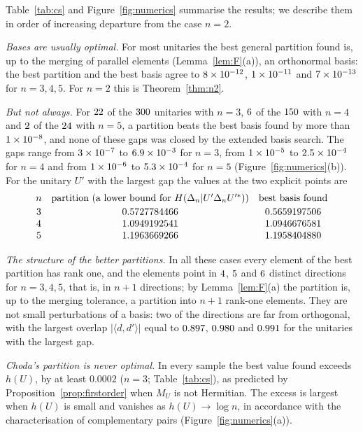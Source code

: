 \documentclass[11pt]{article}
\theoremstyle{plain}
\theoremstyle{definition}
\theoremstyle{remark}
\begin{document}
Table~\ref{tab:cs} and Figure~\ref{fig:numerics} summarise the results; we describe them in order of increasing departure
from the case $n=2$.

\emph{Bases are usually optimal.} For most unitaries the best general partition found is, up to the merging of parallel
elements (Lemma~\ref{lem:F}(a)), an orthonormal basis: the best partition and the best basis agree to $8\times10^{-12}$,
$1\times10^{-11}$ and $7\times10^{-13}$ for $n=3,4,5$. For $n=2$ this is Theorem~\ref{thm:n2}.

\emph{But not always.} For $22$ of the $300$ unitaries with $n=3$, $6$ of the $150$ with
$n=4$ and $2$ of the $24$ with $n=5$, a partition beats the best basis found by more than $1\times10^{-8}$, and none
of these gaps was closed by the extended basis search. The gaps range from $3\times10^{-7}$ to $6.9\times10^{-3}$ for $n=3$, from
$1\times10^{-5}$ to $2.5\times10^{-4}$ for $n=4$ and from $1\times10^{-6}$ to $5.3\times10^{-4}$ for $n=5$ (Figure~\ref{fig:numerics}(b)).
For the unitary $U'$ with the largest gap the values at the two explicit points are
\[
  \begin{array}{ccc}
  n & \text{partition (a lower bound for }H(\Delta_n|U'\Delta_nU'^*)) & \text{best basis found}\\[2pt]
  3 & 0.5727784466 & 0.5659197506\\
  4 & 1.0949192541 & 1.0946676581\\
  5 & 1.1963669266 & 1.1958404880
  \end{array}
\]

\emph{The structure of the better partitions.} In all these cases every element of the best partition has rank one, and the
elements point in $4$, $5$ and $6$ distinct directions for $n=3,4,5$, that is, in $n+1$ directions;
by Lemma~\ref{lem:F}(a) the partition is, up to the merging tolerance, a partition into $n+1$ rank-one elements. They are
not small perturbations of a basis: two of the directions are far from orthogonal, with the largest overlap
$|\langle d,d'\rangle|$ equal to $0.897$, $0.980$ and $0.991$ for the unitaries with the largest gap.

\emph{Choda's partition is never optimal.} In every sample the best value found exceeds $h(U)$, by at least $0.0002$ ($n=3$;
Table~\ref{tab:cs}), as predicted by Proposition~\ref{prop:firstorder} when $M_U$ is not Hermitian. The excess is largest
when $h(U)$ is small and vanishes as $h(U)\to\log n$, in accordance with the characterisation of complementary pairs
(Figure~\ref{fig:numerics}(a)).
\end{document}
